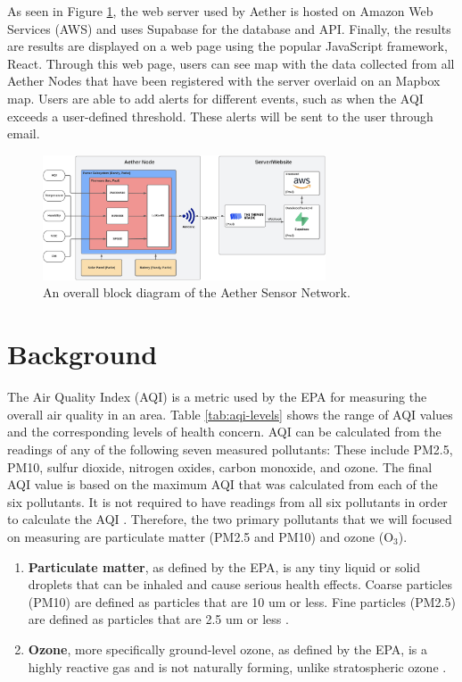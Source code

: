 \documentclass[conference]{IEEEtran}
\begin{document}
As seen in Figure \ref{fig:overall-bd}, the web server used by Aether is hosted on Amazon Web Services (AWS) and uses Supabase for the database and API. Finally, the results are results are displayed on a web page using the popular JavaScript framework, React. Through this web page, users can see map with the data collected from all Aether Nodes that have been registered with the server overlaid on an Mapbox map. Users are able to add alerts for different events, such as when the AQI exceeds a user-defined threshold. These alerts will be sent to the user through email.

\begin{figure}[b]
    \centering
    \includegraphics[width=3.3in]{img/aether-overall-bd.jpeg}
    \caption{An overall block diagram of the Aether Sensor Network.}
    \label{fig:overall-bd}
\end{figure}

\section{Background}

The Air Quality Index (AQI) is a metric used by the EPA for measuring the overall air quality in an area. Table \ref{tab:aqi-levels} shows the range of AQI values and the corresponding levels of health concern. AQI can be calculated from the readings of any of the following seven measured pollutants: These include PM2.5, PM10, sulfur dioxide, nitrogen oxides, carbon monoxide, and ozone. The final AQI value is based on the maximum AQI that was calculated from each of the six pollutants. It is not required to have readings from all six pollutants in order to calculate the AQI \cite{background-aqi}. Therefore, the two primary pollutants that we will focused on measuring are particulate matter (PM2.5 and PM10) and ozone (O$_3$).

\begin{enumerate}
    \item \textbf{Particulate matter}, as defined by the EPA, is any tiny liquid or solid droplets that can be inhaled and cause serious health effects. Coarse particles (PM10) are defined as particles that are 10 um or less. Fine particles (PM2.5) are defined as particles that are 2.5 um or less \cite{background-pm}.
    \item \textbf{Ozone}, more specifically ground-level ozone, as defined by the EPA, is a highly reactive gas and is not naturally forming, unlike stratospheric ozone \cite{background-ozone}.
\end{enumerate}
\end{document}
